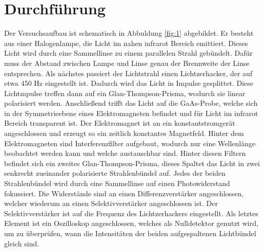 \section{Durchführung}
\label{sec:Durchführung}
Der Versuchsaufbau ist schematisch in Abbuldung \ref{fig:1} abgebildet.
Er besteht aus einer Halogenlampe, die Licht im nahen infrarot Bereich emittiert.
Dieses Licht wird durch eine Sammellinse zu einem parallelen Strahl gebündelt.
Dafür muss der Abstand zwischen Lampe und Linse genau der Brennweite der Linse entsprechen.
Als nächstes passiert der Lichtstrahl einen Lichtzerhacker, der auf etwa 450 Hz eingestellt ist. 
Dadurch wird das Licht in Impulse gesplittet. Diese Lichtmpulse treffen dann 
auf ein Glan-Thompson-Prisma, wodurch sie linear polarisiert werden. 
Anschließend trifft das Licht auf die GaAs-Probe, welche sich in 
der Symmetrieebene eines Elektromagneten befindet und für Licht im infrarot Bereich transparent ist.
Der Elektromagnet ist an ein konstantstromgerät angeschlossen und erzeugt so ein 
zeitlich konstantes Magnetfeld.
Hinter dem Elektromagneten sind Interferenzfilter aufgebaut, 
wodurch nur eine Wellenlänge beobachtet werden kann und welche austauschbar sind. 
Hinter diesen Filtern befindet sich ein zweites Glan-Thompson-Prisma, 
dieses Spaltet das Licht in zwei senkrecht zueinander polarisierte Strahlenbündel auf. 
Jedes der beiden Strahlenbündel wird durch eine Sammellinse auf einen Photowiderstand fokussiert.
Die Widerstände sind an einen Differenzverstärker angeschlossen, welcher wiederum an einen 
Selektivverstärker angeschlossen ist. Der Selektivverstärker ist auf die Frequenz des 
Lichtzerhackers eingestellt. Als letztes Element ist ein Oszilloskop angeschlossen, welches 
als Nulldetektor genutzt wird, um zu überprüfen, wann die Intensitäten der beiden aufgespaltenen 
Lichtbündel gleich sind.

